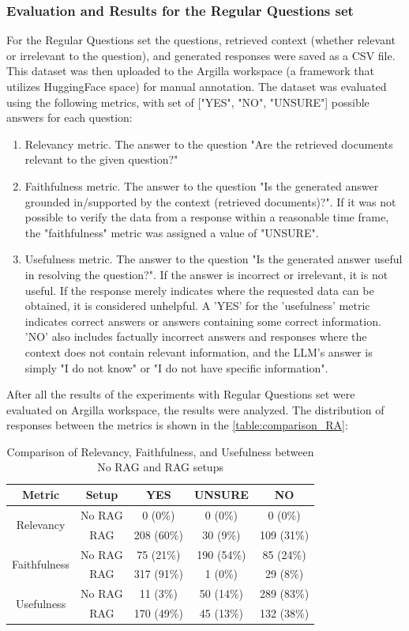 \subsubsection{Evaluation and Results for the Regular Questions set}
For the Regular Questions set the questions, retrieved context (whether relevant or irrelevant to the question), and generated responses were saved as a CSV file. This dataset was then uploaded to the Argilla workspace (a framework that utilizes HuggingFace space) for manual annotation. The dataset was evaluated using the following metrics, with set of ["YES", "NO", "UNSURE"] possible answers for each question:
\begin{enumerate}
\item Relevancy metric. The answer to the question "Are the retrieved documents relevant to the given question?"
\item Faithfulness metric. The answer to the question "Is the generated answer grounded in/supported by the context (retrieved documents)?". If it was not possible to verify the data from a response within a reasonable time frame, the "faithfulness" metric was assigned a value of "UNSURE".
\item Usefulness metric. The answer to the question "Is the generated answer useful in resolving the question?". If the answer is incorrect or irrelevant, it is not useful. If the response merely indicates where the requested data can be obtained, it is considered unhelpful. A 'YES' for the 'usefulness' metric indicates correct answers or answers containing some correct information. 'NO' also includes factually incorrect answers and responses where the context does not contain relevant information, and the LLM's answer is simply "I do not know" or "I do not have specific information".
\end{enumerate}

After all the results of the experiments with Regular Questions set were evaluated on Argilla workspace, the results were analyzed. The distribution of responses between the metrics is shown in the \autoref{table:comparison_RA}:
\begin{table}[h]
\centering
\begin{tabular}{|c|c|c|c|c|}
\hline
\textbf{Metric} & \textbf{Setup} & \textbf{YES} & \textbf{UNSURE} & \textbf{NO} \\ 
\hline
\multirow{2}{*}{Relevancy} & No RAG & 0 (0\%) & 0 (0\%) & 0 (0\%) \\ \cline{2-5}
 & RAG & 208 (60\%) & 30 (9\%) & 109 (31\%) \\
\hline
\multirow{2}{*}{Faithfulness} & No RAG & 75 (21\%) & 190 (54\%) & 85 (24\%) \\ \cline{2-5}
 & RAG & 317 (91\%) & 1 (0\%) & 29 (8\%) \\
\hline
\multirow{2}{*}{Usefulness} & No RAG & 11 (3\%) & 50 (14\%) & 289 (83\%) \\ \cline{2-5}
 & RAG & 170 (49\%) & 45 (13\%) & 132 (38\%) \\
 \hline
\end{tabular}
\caption{Comparison of Relevancy, Faithfulness, and Usefulness between No RAG and RAG setups}
\label{table:comparison_RA}
\end{table}

